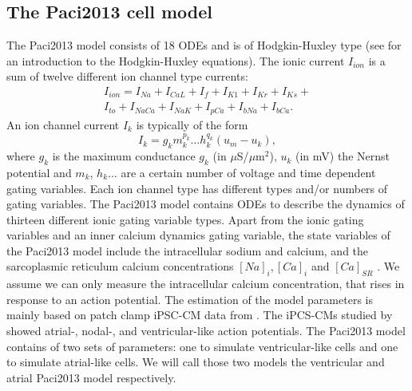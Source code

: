 \documentclass[12pt,a4paper]{article}
\begin{document}
\subsection{The Paci2013 cell model} \label{The Paci2013 cell model}
The Paci2013 model consists of 18 ODEs and is of Hodgkin-Huxley type (see \cite[p. 195-215]{KeenerI} for an introduction to the Hodgkin-Huxley equations). The ionic current $I_{ion}$ is a sum of twelve different ion channel type currents:
\begin{eqnarray}
I_{ion}=I_{Na}+I_{CaL}+I_f+I_{K1}+I_{Kr}+I_{Ks}+ \\
I_{to}+I_{NaCa}+I_{NaK}+I_{pCa}+I_{bNa}+I_{bCa}.
\end{eqnarray}
An ion channel current $I_k$ is typically of the form 
\begin{equation}
I_{k}=g_k m_k^{p_k}\ldots h_k^{q_k}(u_m-u_k),
\end{equation}
where $g_k$ is the maximum conductance $g_k$ (in $\mu$S/$\mu$m$^2$), $u_k$ (in mV) the Nernst potential and $m_k$, $h_k \ldots$ are a certain number of voltage and time dependent gating variables. Each ion channel type has different types and/or numbers of gating variables. The Paci2013 model contains ODEs to describe the dynamics of thirteen different ionic gating variable types. Apart from the ionic gating variables and an inner calcium dynamics gating variable, the state variables of the Paci2013 model include the intracellular sodium and calcium, and the sarcoplasmic reticulum calcium concentrations $[Na]_i, [Ca]_i$ and $[Ca]_{SR}$ \cite{Paci2013}. We assume we can only measure the intracellular calcium concentration, that rises in response to an action potential. The estimation of the model parameters is mainly based on patch clamp iPSC-CM data from \cite{Ma2011}. The iPCS-CMs studied by \cite{Ma2011} showed atrial-, nodal-, and ventricular-like action potentials. The Paci2013 model contains of two sets of parameters: one to simulate ventricular-like cells and one to simulate atrial-like cells. We will call those two models the ventricular and atrial Paci2013 model respectively.
%
%
\\
\end{document}
